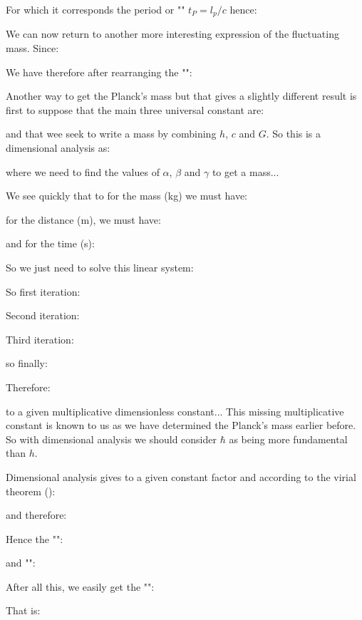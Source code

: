 	For which it corresponds the period or "" $t_P=l_p/c$ hence:
	
	We can now return to another more interesting expression of the fluctuating mass. Since:
	
	We have therefore after rearranging the "":
	
	Another way to get the Planck's mass but that gives a slightly different result is first to suppose that the main three universal constant are:
	
	and that wee seek to write a mass by combining $h$, $c$ and $G$. So this is a dimensional analysis as:
	
	where we need to find the values of $\alpha$, $\beta$ and $\gamma$ to get a mass...
	
	We see quickly that to for the mass (kg) we must have:
	
	for the distance (m), we must have:
	
	and for the time (s):
	
	So we just need to solve this linear system:
	
	So first iteration:
	
	Second iteration:
	
	Third iteration:
	
	so finally:
	
	Therefore:
	
	to a given multiplicative dimensionless constant... This missing multiplicative constant is known to us as we have determined the Planck's mass earlier before. So with dimensional analysis we should consider $\hbar$ as being more fundamental than $h$.
	
	Dimensional analysis gives to a given constant factor and according to the virial theorem ():
	
	and therefore:
	
	Hence the "":
	
	and "":
	
	After all this, we easily get the "":
	
	That is:
	
